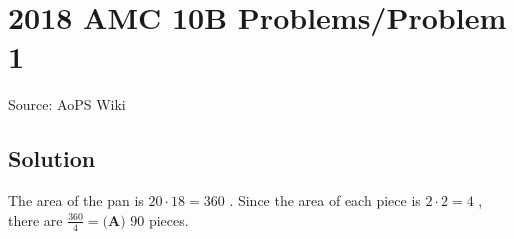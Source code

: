 \documentclass[12pt]{article}
\begin{document}
\section*{{2018 AMC 10B Problems/Problem 1}}
Source: AoPS Wiki

\subsection*{Solution}
The area of the pan is $20\cdot18=360$ . Since the area of each piece is $2\cdot2=4$ , there are $\frac{360}{4} = \boxed{\textbf{(A) } 90}$ pieces.
\end{document}
